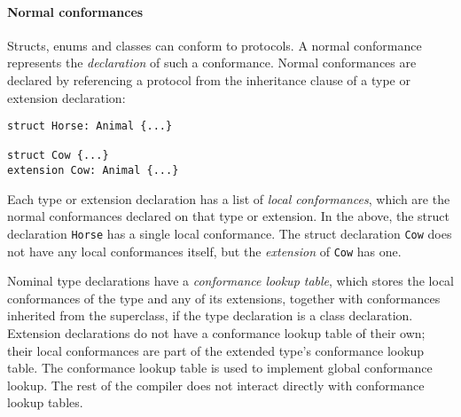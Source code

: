 \documentclass[a4paper,headsepline,bibliography=totoc,toc=flat,fleqn,twoside=semi]{scrbook}
\theoremstyle{definition}
\theoremstyle{definition}
\theoremstyle{definition}
\begin{document}
\paragraph{Normal conformances} Structs, enums and classes can conform to protocols. A normal conformance represents the \emph{declaration} of such a conformance. Normal conformances are declared by referencing a protocol from the inheritance clause of a type or extension declaration:
\begin{Verbatim}
struct Horse: Animal {...}

struct Cow {...}
extension Cow: Animal {...}
\end{Verbatim}
Each type or extension declaration has a list of \emph{local conformances}, which are the normal conformances declared on that type or extension. In the above, the struct declaration \texttt{Horse} has a single local conformance. The struct declaration \texttt{Cow} does not have any local conformances itself, but the \emph{extension} of \texttt{Cow} has one. 

Nominal type declarations have a \emph{conformance lookup table}, which stores the local conformances of the type and any of its extensions, together with conformances inherited from the superclass, if the type declaration is a class declaration. Extension declarations do not have a conformance lookup table of their own; their local conformances are part of the extended type's conformance lookup table. The conformance lookup table is used to implement global conformance lookup. The rest of the compiler does not interact directly with conformance lookup tables.
\end{document}
